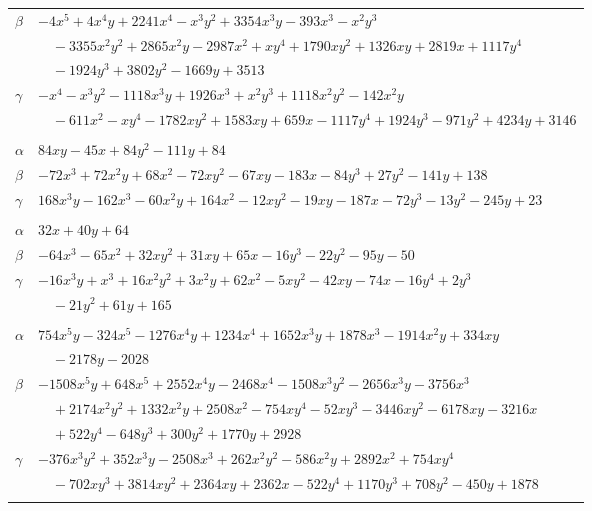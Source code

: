 \documentclass[11pt]{article}
\begin{document}
\begin{longtable}{@{}ll@{}}
$\beta$ & $-4x^{5}+4x^{4}y+2241x^{4}-x^{3}y^{2}+3354x^{3}y-393x^{3}-x^{2}y^{3}$\\
 & $\quad -3355x^{2}y^{2}+2865x^{2}y-2987x^{2}+xy^{4}+1790xy^{2}+1326xy+2819x+1117y^{4}$\\
 & $\quad -1924y^{3}+3802y^{2}-1669y+3513$\\
$\gamma$ & $-x^{4}-x^{3}y^{2}-1118x^{3}y+1926x^{3}+x^{2}y^{3}+1118x^{2}y^{2}-142x^{2}y$\\
 & $\quad -611x^{2}-xy^{4}-1782xy^{2}+1583xy+659x-1117y^{4}+1924y^{3}-971y^{2}+4234y+3146$\\
\addlinespace[3pt]
\multicolumn{2}{@{}l}{$\{i,j\}=\{32,85\}$, $k_{ij}=2\cdot 3^{3}$}\\
$\alpha$ & $84xy-45x+84y^{2}-111y+84$\\
$\beta$ & $-72x^{3}+72x^{2}y+68x^{2}-72xy^{2}-67xy-183x-84y^{3}+27y^{2}-141y+138$\\
$\gamma$ & $168x^{3}y-162x^{3}-60x^{2}y+164x^{2}-12xy^{2}-19xy-187x-72y^{3}-13y^{2}-245y+23$\\
\addlinespace[3pt]
\multicolumn{2}{@{}l}{$\{i,j\}=\{32,105\}$, $k_{ij}=2^{3}\cdot 3^{3}$}\\
$\alpha$ & $32x+40y+64$\\
$\beta$ & $-64x^{3}-65x^{2}+32xy^{2}+31xy+65x-16y^{3}-22y^{2}-95y-50$\\
$\gamma$ & $-16x^{3}y+x^{3}+16x^{2}y^{2}+3x^{2}y+62x^{2}-5xy^{2}-42xy-74x-16y^{4}+2y^{3}$\\
 & $\quad -21y^{2}+61y+165$\\
\addlinespace[3pt]
\multicolumn{2}{@{}l}{$\{i,j\}=\{33,34\}$, $k_{ij}=2^{2}\cdot 3\cdot 13^{2}$}\\
$\alpha$ & $754x^{5}y-324x^{5}-1276x^{4}y+1234x^{4}+1652x^{3}y+1878x^{3}-1914x^{2}y+334xy$\\
 & $\quad -2178y-2028$\\
$\beta$ & $-1508x^{5}y+648x^{5}+2552x^{4}y-2468x^{4}-1508x^{3}y^{2}-2656x^{3}y-3756x^{3}$\\
 & $\quad +2174x^{2}y^{2}+1332x^{2}y+2508x^{2}-754xy^{4}-52xy^{3}-3446xy^{2}-6178xy-3216x$\\
 & $\quad +522y^{4}-648y^{3}+300y^{2}+1770y+2928$\\
$\gamma$ & $-376x^{3}y^{2}+352x^{3}y-2508x^{3}+262x^{2}y^{2}-586x^{2}y+2892x^{2}+754xy^{4}$\\
 & $\quad -702xy^{3}+3814xy^{2}+2364xy+2362x-522y^{4}+1170y^{3}+708y^{2}-450y+1878$\\
\addlinespace[3pt]
\multicolumn{2}{@{}l}{$\{i,j\}=\{33,37\}$, $k_{ij}=2^{2}\cdot 3$}\\

\end{longtable}
\end{document}
